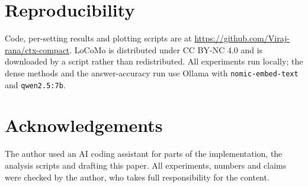 \documentclass[11pt]{article}
\begin{document}
\section*{Reproducibility}
Code, per-setting results and plotting scripts are at
\url{https://github.com/Viraj-rana/ctx-compact}. LoCoMo is distributed under CC BY-NC 4.0 and is
downloaded by a script rather than redistributed. All experiments run locally; the dense
methods and the answer-accuracy run use Ollama with \texttt{nomic-embed-text} and
\texttt{qwen2.5:7b}.

\section*{Acknowledgements}
The author used an AI coding assistant for parts of the implementation, the analysis scripts
and drafting this paper. All experiments, numbers and claims were checked by the author, who
takes full responsibility for the content.



\end{document}

